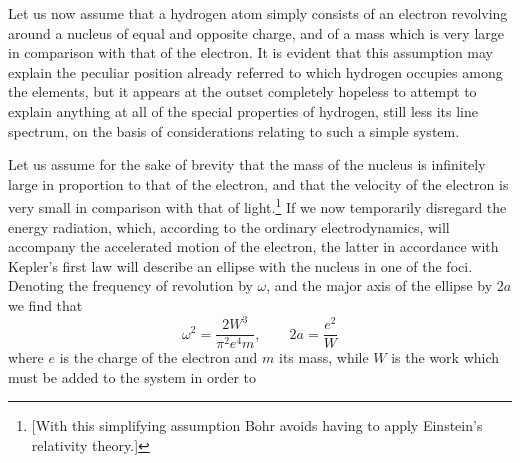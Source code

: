 Let us now assume that a hydrogen atom simply consists of an electron
revolving around a nucleus of equal and opposite charge, and of a mass
which is very large in comparison with that of the electron. It is
evident that this assumption may explain the peculiar position already
referred to which hydrogen occupies among the elements, but it appears
at the outset completely hopeless to attempt to explain anything at all
of the special properties of hydrogen, still less its line spectrum, on
the basis of considerations relating to such a simple system.

Let us assume for the sake of brevity that the mass of the nucleus is
infinitely large in proportion to that of the electron, and that the
velocity of the electron is very small in comparison with that of
light.\footnote{{[}With this simplifying assumption Bohr avoids having
  to apply Einstein's relativity theory.{]}} If we now temporarily
disregard the energy radiation, which, according to the ordinary
electrodynamics, will accompany the accelerated motion of the electron,
the latter in accordance with Kepler's first law will describe an
ellipse with the nucleus in one of the foci. Denoting the frequency of
revolution by $\omega$, and the major axis of the ellipse by 2$a$
we find that
%
\begin{equation}
\omega^2 = \frac{2W^3}{\pi^2e^4m} ,\quad\quad 2a = \frac{e^2}{W}
\end{equation}
%
where $e$ is the charge of the electron and $m$ its mass,
while $W$ is the work which must be added to the system in order to
